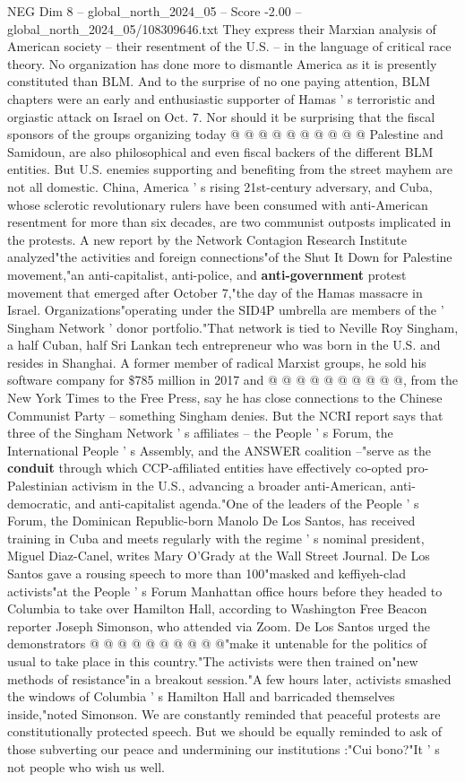 \begin{textsample}{NEG Dim 8 – global\_north\_2024\_05 – Score -2.00 – global\_north\_2024\_05/108309646.txt}
They express their Marxian analysis of American society -- their resentment of the U.S. -- in the language of critical race theory.
No organization has done more to dismantle America as it is presently constituted than BLM.
And to the surprise of no one paying attention, BLM chapters were an early and enthusiastic supporter of Hamas ' s terroristic and orgiastic attack on Israel on Oct. 7.
Nor should it be surprising that the fiscal sponsors of the groups organizing today @ @ @ @ @ @ @ @ @ @ Palestine and Samidoun, are also philosophical and even fiscal backers of the different BLM entities.
But U.S. enemies supporting and benefiting from the street mayhem are not all domestic.
China, America ' s rising 21st-century adversary, and Cuba, whose sclerotic revolutionary rulers have been consumed with anti-American resentment for more than six decades, are two communist outposts implicated in the protests.
A new report by the Network Contagion Research Institute analyzed"the activities and foreign connections"of the Shut It Down for Palestine movement,"an anti-capitalist, anti-police, and \textbf{anti-government} protest movement that emerged after October 7,"the day of the Hamas massacre in Israel.
Organizations"operating under the SID4P umbrella are members of the ' Singham Network ' donor portfolio."That network is tied to Neville Roy Singham, a half Cuban, half Sri Lankan tech entrepreneur who was born in the U.S. and resides in Shanghai.
A former member of radical Marxist groups, he sold his software company for \$785 million in 2017 and @ @ @ @ @ @ @ @ @ @, from the New York Times to the Free Press, say he has close connections to the Chinese Communist Party -- something Singham denies.
But the NCRI report says that three of the Singham Network ' s affiliates -- the People ' s Forum, the International People ' s Assembly, and the ANSWER coalition --"serve as the \textbf{conduit} through which CCP-affiliated entities have effectively co-opted pro-Palestinian activism in the U.S., advancing a broader anti-American, anti-democratic, and anti-capitalist agenda."One of the leaders of the People ' s Forum, the Dominican Republic-born Manolo De Los Santos, has received training in Cuba and meets regularly with the regime ' s nominal president, Miguel Diaz-Canel, writes Mary O'Grady at the Wall Street Journal.
De Los Santos gave a rousing speech to more than 100"masked and keffiyeh-clad activists"at the People ' s Forum Manhattan office hours before they headed to Columbia to take over Hamilton Hall, according to Washington Free Beacon reporter Joseph Simonson, who attended via Zoom.
De Los Santos urged the demonstrators @ @ @ @ @ @ @ @ @ @"make it untenable for the politics of usual to take place in this country."The activists were then trained on"new methods of resistance"in a breakout session."A few hours later, activists smashed the windows of Columbia ' s Hamilton Hall and barricaded themselves inside,"noted Simonson.
We are constantly reminded that peaceful protests are constitutionally protected speech.
But we should be equally reminded to ask of those subverting our peace and undermining our institutions :"Cui bono?"It ' s not people who wish us well.


\end{textsample}
